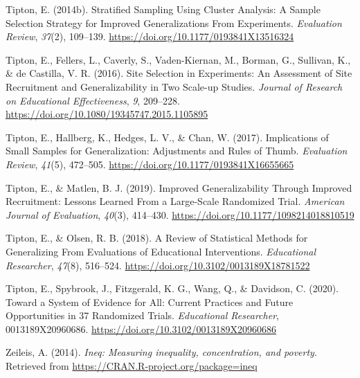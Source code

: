 \documentclass[
  english,
  man,floatsintext]{apa6}
\newlength{\cslhangindent}
\newlength{\cslentryspacingunit} %
\newenvironment{CSLReferences}[2] %
 {%
  \setlength{\parindent}{0pt}
  \ifodd #1
  \let\oldpar\par
  \def\par{\hangindent=\cslhangindent\oldpar}
  \fi
  \setlength{\parskip}{#2\cslentryspacingunit}
 }%
 {}
\begin{document}
\begin{CSLReferences}{1}{0}
\leavevmode{}%
Tipton, E. (2014b). Stratified {Sampling Using Cluster Analysis}: {A Sample Selection Strategy} for {Improved Generalizations From Experiments}. \emph{Evaluation Review}, \emph{37}(2), 109--139. \url{https://doi.org/10.1177/0193841X13516324}

\leavevmode{}%
Tipton, E., Fellers, L., Caverly, S., Vaden-Kiernan, M., Borman, G., Sullivan, K., \& de Castilla, V. R. (2016). Site {Selection} in {Experiments}: {An Assessment} of {Site Recruitment} and {Generalizability} in {Two Scale}-up {Studies}. \emph{Journal of Research on Educational Effectiveness}, \emph{9}, 209--228. \url{https://doi.org/10.1080/19345747.2015.1105895}

\leavevmode{}%
Tipton, E., Hallberg, K., Hedges, L. V., \& Chan, W. (2017). Implications of {Small Samples} for {Generalization}: {Adjustments} and {Rules} of {Thumb}. \emph{Evaluation Review}, \emph{41}(5), 472--505. \url{https://doi.org/10.1177/0193841X16655665}

\leavevmode{}%
Tipton, E., \& Matlen, B. J. (2019). Improved {Generalizability Through Improved Recruitment}: {Lessons Learned From} a {Large}-{Scale Randomized Trial}. \emph{American Journal of Evaluation}, \emph{40}(3), 414--430. \url{https://doi.org/10.1177/1098214018810519}

\leavevmode{}%
Tipton, E., \& Olsen, R. B. (2018). A {Review} of {Statistical} {Methods} for {Generalizing} {From} {Evaluations} of {Educational} {Interventions}. \emph{Educational Researcher}, \emph{47}(8), 516--524. \url{https://doi.org/10.3102/0013189X18781522}

\leavevmode{}%
Tipton, E., Spybrook, J., Fitzgerald, K. G., Wang, Q., \& Davidson, C. (2020). Toward a {System} of {Evidence} for {All}: {Current Practices} and {Future Opportunities} in 37 {Randomized Trials}. \emph{Educational Researcher}, 0013189X20960686. \url{https://doi.org/10.3102/0013189X20960686}

\leavevmode{}%
Zeileis, A. (2014). \emph{Ineq: Measuring inequality, concentration, and poverty}. Retrieved from \url{https://CRAN.R-project.org/package=ineq}

\end{CSLReferences}
\end{document}
